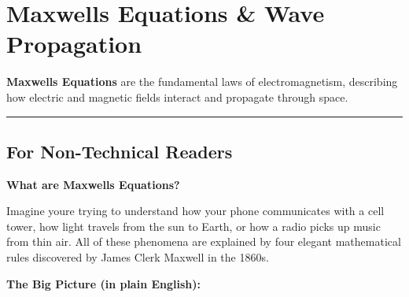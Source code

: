 \section{Maxwell\textquotesingle s Equations \& Wave
Propagation}\label{maxwells-equations-wave-propagation}

\textbf{Maxwell\textquotesingle s Equations} are the fundamental laws of
electromagnetism, describing how electric and magnetic fields interact
and propagate through space.

\begin{center}\rule{0.5\linewidth}{0.5pt}\end{center}

\subsection{\texorpdfstring{ For Non-Technical
Readers}{ For Non-Technical Readers}}\label{for-non-technical-readers}

\textbf{What are Maxwell\textquotesingle s Equations?}

Imagine you\textquotesingle re trying to understand how your phone
communicates with a cell tower, how light travels from the sun to Earth,
or how a radio picks up music from thin air. All of these phenomena are
explained by four elegant mathematical rules discovered by James Clerk
Maxwell in the 1860s.

\textbf{The Big Picture (in plain English):}

